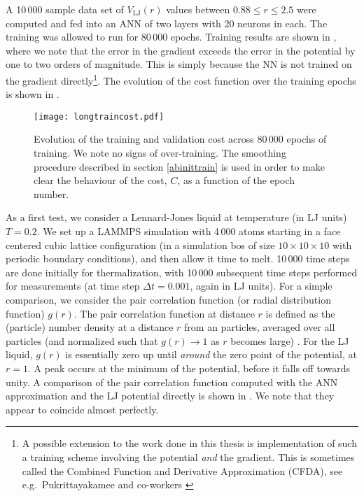 \documentclass[../../master.tex]{subfiles}
\begin{document}
A 10\,000 sample data set of $V_\text{LJ}(r)$ values between $0.88\le r \le 2.5$ were computed and fed into an ANN of two layers with 20 neurons in each. The training was allowed to run for 80\,000 epochs. Training results are shown in , where we note that the error in the gradient exceeds the error in the potential by one to two orders of magnitude. This is simply because the NN is not trained on the gradient directly\footnote{A possible extension to the work done in this thesis is implementation of such a training scheme involving the potential \emph{and} the gradient. This is sometimes called the Combined Function and Derivative Approximation (CFDA), see e.g.\ Pukrittayakamee and co-workers \cite{pukrittayakamee2009simultaneous}}. The evolution of the cost function over the training epochs is shown in . 

\begin{SCfigure}
\centering
\texttt{[image: longtraincost.pdf]}
\caption{Evolution of the training and validation cost across 80\,000 epochs of training. We note no signs of over-training. The smoothing procedure described in section \ref{abinittrain} is used in order to make clear the behaviour of the cost, $C$, as a function of the epoch number. \label{fig:longtrainmeta}}
\end{SCfigure}





As a first test, we consider a Lennard-Jones liquid at temperature (in LJ units) $T=0.2$. We set up a LAMMPS simulation with 4\,000 atoms starting in a face centered cubic lattice configuration (in a simulation bos of size $10\times10\times10$ with periodic boundary conditions), and then allow it time to melt. 10\,000 time steps are done initially for thermalization, with 10\,000 subsequent time steps performed for measurements (at time step $\mathit{\Delta}t=0.001$, again in LJ units). For a simple comparison, we consider the pair correlation function (or radial distribution function) $g(r)$. The pair correlation function at distance $r$ is defined as the (particle) number density at a distance $r$ from an particles, averaged over all particles (and normalized such that $g(r)\rightarrow1$ as $r$ becomes large) \cite{frenkel}. For the LJ liquid, $g(r)$ is essentially zero up until \emph{around} the zero point of the potential, at $r=1$. A peak occurs at the minimum of the potential, before it falls off towards unity. A comparison of the pair correlation function computed with the ANN approximation and the LJ potential directly is shown in . We note that they appear to coincide almost perfectly. 
\end{document}
